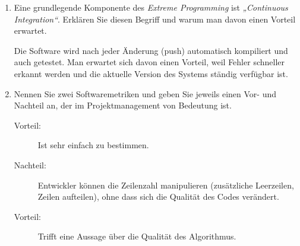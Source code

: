 \documentclass{lehramt-informatik-aufgabe}
\begin{document}
\begin{enumerate}
\begin{liAntwort}
\end{liAntwort}


\item Eine grundlegende Komponente des \emph{Extreme Programming} ist
\emph{„Continuous Integration“}. Erklären Sie diesen Begriff und warum
man davon einen Vorteil erwartet.

\begin{liAntwort}
Die Software wird nach jeder Änderung (push) automatisch kompiliert und
auch getestet. Man erwartet sich davon einen Vorteil, weil Fehler
schneller erkannt werden und die aktuelle Version des Systems ständig
verfügbar ist.
\end{liAntwort}


\item Nennen Sie zwei Softwaremetriken und geben Sie jeweils einen Vor-
und Nachteil an, der im Projektmanagement von Bedeutung
ist.

\begin{liAntwort}

\begin{description}
\item[Vorteil:]

Ist sehr einfach zu bestimmen.

\item[Nachteil:]

Entwickler können die Zeilenzahl manipulieren (zusätzliche Leerzeilen,
Zeilen aufteilen), ohne dass sich die Qualität des Codes verändert.
\end{description}


\begin{description}
\item[Vorteil:]

Trifft eine Aussage über die Qualität des Algorithmus.


\end{description}
\end{liAntwort}
\end{enumerate}
\end{document}
